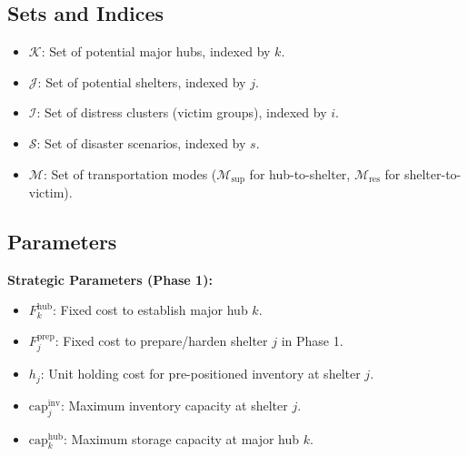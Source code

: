 \subsection{Sets and Indices}
\begin{itemize}
    \item $\mathcal{K}$: Set of potential major hubs, indexed by $k$.
    \item $\mathcal{J}$: Set of potential shelters, indexed by $j$.
    \item $\mathcal{I}$: Set of distress clusters (victim groups), indexed by $i$.
    \item $\mathcal{S}$: Set of disaster scenarios, indexed by $s$.
    \item $\mathcal{M}$: Set of transportation modes ($\mathcal{M}_{\text{sup}}$ for hub-to-shelter, $\mathcal{M}_{\text{res}}$ for shelter-to-victim).
\end{itemize}

\subsection{Parameters}
\textbf{Strategic Parameters (Phase 1):}
\begin{itemize}
    \item $F_k^{\text{hub}}$: Fixed cost to establish major hub $k$.
    \item $F_j^{\text{prep}}$: Fixed cost to prepare/harden shelter $j$ in Phase 1.
    \item $h_j$: Unit holding cost for pre-positioned inventory at shelter $j$.
    \item $\text{cap}_j^{\text{inv}}$: Maximum inventory capacity at shelter $j$.
    \item $\text{cap}_k^{\text{hub}}$: Maximum storage capacity at major hub $k$.
\end{itemize}

